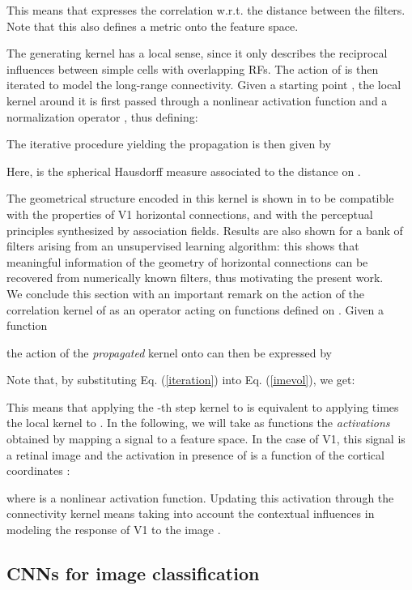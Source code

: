 \documentclass[11pt,oneside,reqno]{amsart}
\begin{document}
 This means that  expresses the correlation w.r.t. the  distance between the filters. Note that this also defines a metric  onto the feature space.
 
 The generating kernel has a local sense, since it only describes the reciprocal influences between simple cells with overlapping RFs. The action of  is then iterated to model the long-range connectivity. Given a starting point , the local kernel around it is first passed through a nonlinear activation function  and a normalization operator
 \citep[see also][]{coiflaf}, thus defining:
 
 The iterative procedure yielding the propagation is then given by
 
 Here,  is the spherical Hausdorff measure \citep{hausd} associated to the distance  on .
 
 The geometrical structure encoded in this kernel is shown in \citet{neuro} to be compatible with the properties of V1 horizontal connections, and with the perceptual principles synthesized by association fields. Results are also shown for a bank of filters arising from an unsupervised learning algorithm: this shows that meaningful information of the geometry of horizontal connections can be recovered from numerically known filters, thus motivating the present work.\\
 
 We conclude this section with an important remark on the action of the correlation kernel of \cite{neuro} as an operator acting on functions defined on . Given a function 
 
 the action of the \emph{propagated} kernel onto  can then be expressed by
 
 Note that, by substituting Eq. (\ref{iteration}) into Eq. (\ref{imevol}), we get:
 
 This means that applying the -th step kernel to  is equivalent to applying  times the local kernel to . In the following, we will take as functions  the \emph{activations} obtained by mapping a signal to a feature space. In the case of V1, this signal is a retinal image  and the activation in presence of  is a function of the cortical coordinates :
 
 where  is a nonlinear activation function. Updating this activation through the connectivity kernel means taking into account the contextual influences in modeling the response of V1 to the image .
 
 \subsection{CNNs for image classification}
 
\end{document}
